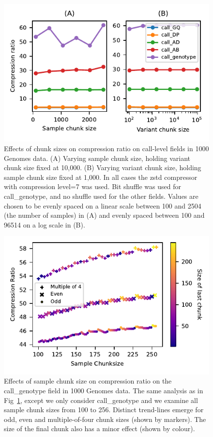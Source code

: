 \documentclass[a4paper,num-refs]{oup-contemporary}
\begin{document}
\begin{figure}[h]
\includegraphics{figures/compression-chunksize}
\caption{Effects of chunk sizes on compression ratio on call-level 
fields in 1000 Genomes data.
(A) Varying sample chunk size, holding variant chunk size fixed at 10,000.
(B) Varying variant chunk size, holding sample chunk size fixed at 1,000.
In all cases the zstd compressor with compression level=7 was used. Bit shuffle
was used for call\_genotype, and no shuffle used for the other fields.
Values are chosen to be evenly spaced on a linear scale 
between 100 and 2504 (the number of samples) in (A) and 
evenly spaced between 100 and 96514 on a log scale in (B). 
\label{fig-compression-chunksize}}
\end{figure}

\begin{figure}[h]
\includegraphics{figures/compression-chunksize-finegrained.pdf}
\caption{Effects of sample chunk size on compression ratio on the call\_genotype
field in 1000 Genomes data.
The same analysis as in Fig~\ref{fig-compression-chunksize}, except we only
consider call\_genotype and we examine all sample chunk sizes from 
100 to 256. Distinct trend-lines emerge for odd, even and multiple-of-four
chunk sizes (shown by markers). The size of the final chunk also has a minor
effect (shown by colour).
\label{fig-compression-chunksize-finegrained}}
\end{figure}
\end{document}
